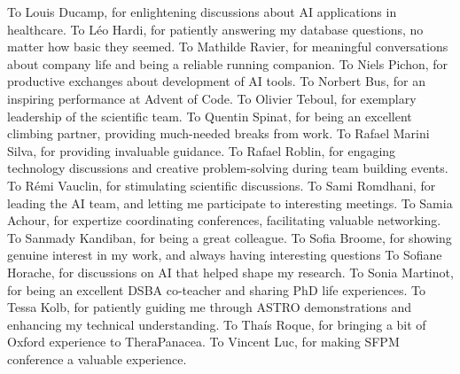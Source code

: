 To Louis Ducamp, for enlightening discussions about AI applications in healthcare.\n
To Léo Hardi, for patiently answering my database questions, no matter how basic they seemed.\n
To Mathilde Ravier, for meaningful conversations about company life and being a reliable running companion.\n
To Niels Pichon, for productive exchanges about development of AI tools.\n
To Norbert Bus, for an inspiring performance at Advent of Code.\n
To Olivier Teboul, for exemplary leadership of the scientific team.\n
To Quentin Spinat, for being an excellent climbing partner, providing much-needed breaks from work.\n
To Rafael Marini Silva, for providing invaluable guidance.\n
To Rafael Roblin, for engaging technology discussions and creative problem-solving during team building events.\n
To Rémi Vauclin, for stimulating scientific discussions.\n
To Sami Romdhani, for leading the AI team, and letting me participate to interesting meetings.\n
To Samia Achour, for expertize coordinating conferences, facilitating valuable networking.\n
To Sanmady Kandiban, for being a great colleague.\n
To Sofia Broome, for showing genuine interest in my work, and always having interesting questions\n
To Sofiane Horache, for discussions on AI that helped shape my research.\n
To Sonia Martinot, for being an excellent DSBA co-teacher and sharing PhD life experiences.\n
To Tessa Kolb, for patiently guiding me through ASTRO demonstrations and enhancing my technical understanding.\n
To Thaís Roque, for bringing a bit of Oxford experience to TheraPanacea.\n
To Vincent Luc, for making SFPM conference a valuable experience.\n


